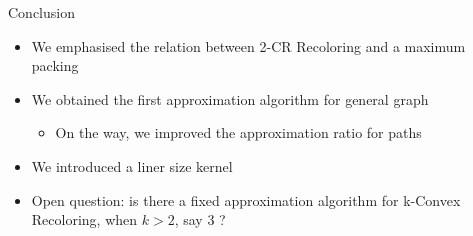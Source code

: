 \begin{frame}{Conclusion}
\begin{itemize}
	

\item
We emphasised the relation between 2-CR Recoloring and a maximum packing 

\pause\item
We obtained the first approximation algorithm for general graph
\begin{itemize}
\pause\item
On the way, we improved the approximation ratio for paths 
\end{itemize}

\pause\item
We introduced a liner size kernel

\pause\item
Open question: is there a fixed approximation algorithm for k-Convex Recoloring, 
when $k > 2$, say 3 ?
		
	
\end{itemize}
\end{frame}